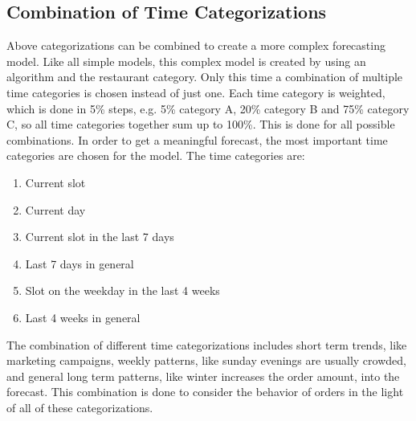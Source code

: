 \subsection{Combination of Time Categorizations}\label{subsection:Categorizing by Order}
Above categorizations can be combined to create a more complex forecasting model. Like all simple models, this complex model is created by using an algorithm and the restaurant category. Only this time a combination of multiple time categories is chosen instead of just one. Each time category is weighted, which is done in 5\% steps, e.g. 5\% category A, 20\% category B and 75\% category C, so all time categories together sum up to 100\%.  This is done for all possible combinations. In order to get a meaningful forecast, the most important time categories are chosen for the model. The time categories are:
\begin{enumerate}
\item Current slot
\item Current day
\item Current slot in the last 7 days
\item Last 7 days in general
\item Slot on the weekday in the last 4 weeks
\item Last 4 weeks in general
\end{enumerate}

The combination of different time categorizations includes short term trends, like marketing campaigns, weekly patterns, like sunday evenings are usually crowded, and general long term patterns, like winter increases the order amount, into the forecast.\newline
This combination is done to consider the behavior of orders in the light of all of these categorizations.
